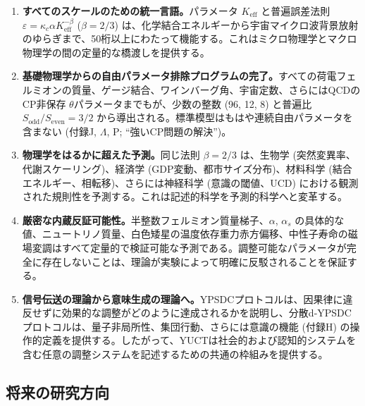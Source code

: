 \documentclass[11pt,a4paper]{article}
\begin{document}
	\begin{enumerate}
		\item \textbf{すべてのスケールのための統一言語。}パラメータ \(K_{\mathrm{eff}}\) と普遍誤差法則 \(\varepsilon = \kappa_c \alpha K_{\mathrm{eff}}^{-\beta}\) (\(\beta = 2/3\)) は、化学結合エネルギーから宇宙マイクロ波背景放射のゆらぎまで、50桁以上にわたって機能する。これはミクロ物理学とマクロ物理学の間の定量的な橋渡しを提供する。
		
		\item \textbf{基礎物理学からの自由パラメータ排除プログラムの完了。}すべての荷電フェルミオンの質量、ゲージ結合、ワインバーグ角、宇宙定数、さらにはQCDのCP非保存 \(\theta\)パラメータまでもが、少数の整数 (96, 12, 8) と普遍比 \(S_{\mathrm{odd}}/S_{\mathrm{even}} = 3/2\) から導出される。標準模型はもはや連続自由パラメータを含まない (付録J, \(\Lambda\), P; ``強いCP問題の解決'')。
		
		\item \textbf{物理学をはるかに超えた予測。}同じ法則 \(\beta = 2/3\) は、生物学 (突然変異率、代謝スケーリング)、経済学 (GDP変動、都市サイズ分布)、材料科学 (結合エネルギー、相転移)、さらには神経科学 (意識の閾値、UCD) における観測された規則性を予測する。これは記述的科学を予測的科学へと変革する。
		
		\item \textbf{厳密な内蔵反証可能性。}半整数フェルミオン質量梯子、\(\alpha\), \(\alpha_s\) の具体的な値、ニュートリノ質量、白色矮星の温度依存重力赤方偏移、中性子寿命の磁場変調はすべて定量的で検証可能な予測である。調整可能なパラメータが完全に存在しないことは、理論が実験によって明確に反駁されることを保証する。
		
		\item \textbf{信号伝送の理論から意味生成の理論へ。}YPSDCプロトコルは、因果律に違反せずに効果的な調整がどのように達成されるかを説明し、分散d‑YPSDCプロトコルは、量子非局所性、集団行動、さらには意識の機能 (付録H) の操作的定義を提供する。したがって、YUCTは社会的および認知的システムを含む任意の調整システムを記述するための共通の枠組みを提供する。
	\end{enumerate}
	
	\subsection{将来の研究方向}
	
\end{document}
